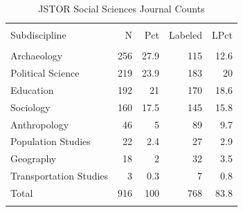 \documentclass[]{book}
\theoremstyle{definition}
\theoremstyle{definition}
\theoremstyle{definition}
\theoremstyle{remark}
\begin{document}
\begin{table}[!htbp] \centering 
  \caption{JSTOR Social Sciences Journal Counts} 
  \label{tab:jclu-tab-sub} 
\begin{tabular}{@{\extracolsep{5pt}} lrrrr} 
\\[-1.8ex]\hline 
\hline \\[-1.8ex] 
Subdiscipline & N & Pct & Labeled & LPct \\ 
\hline \\[-1.8ex] 
Archaeology & 256 & 27.9 & 115 & 12.6 \\ 
Political Science & 219 & 23.9 & 183 & 20 \\ 
Education & 192 & 21 & 170 & 18.6 \\ 
Sociology & 160 & 17.5 & 145 & 15.8 \\ 
Anthropology & 46 & 5 & 89 & 9.7 \\ 
Population Studies & 22 & 2.4 & 27 & 2.9 \\ 
Geography & 18 & 2 & 32 & 3.5 \\ 
Transportation Studies & 3 & 0.3 & 7 & 0.8 \\ 
Total & 916 & 100 & 768 & 83.8 \\ 
\hline \\[-1.8ex] 
\end{tabular} 
\end{table}
\end{document}
